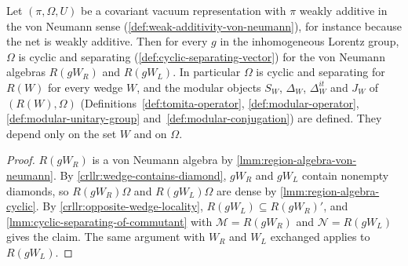 \begin{theorem}
    \label{thrm:wedge-cyclic-separating}
    \leanok
    Let $(\pi, \Omega, U)$ be a covariant vacuum representation with $\pi$ weakly additive in the von Neumann sense (\ref{def:weak-additivity-von-neumann}), for instance because the net is weakly additive. Then for every $g$ in the inhomogeneous Lorentz group, $\Omega$ is cyclic and separating (\ref{def:cyclic-separating-vector}) for the von Neumann algebras $R(gW_R)$ and $R(gW_L)$. In particular $\Omega$ is cyclic and separating for $R(W)$ for every wedge $W$, and the modular objects $S_W$, $\Delta_W$, $\Delta_W^{it}$ and $J_W$ of $(R(W), \Omega)$ (Definitions~\ref{def:tomita-operator}, \ref{def:modular-operator}, \ref{def:modular-unitary-group} and~\ref{def:modular-conjugation}) are defined. They depend only on the set $W$ and on $\Omega$.
\end{theorem}
\begin{proof}
    \leanok
    $R(gW_R)$ is a von Neumann algebra by \ref{lmm:region-algebra-von-neumann}. By \ref{crllr:wedge-contains-diamond}, $gW_R$ and $gW_L$ contain nonempty diamonds, so $R(gW_R)\Omega$ and $R(gW_L)\Omega$ are dense by \ref{lmm:region-algebra-cyclic}. By \ref{crllr:opposite-wedge-locality}, $R(gW_L) \subseteq R(gW_R)'$, and \ref{lmm:cyclic-separating-of-commutant} with $\mathcal{M} = R(gW_R)$ and $\mathcal{N} = R(gW_L)$ gives the claim. The same argument with $W_R$ and $W_L$ exchanged applies to $R(gW_L)$.
\end{proof}

